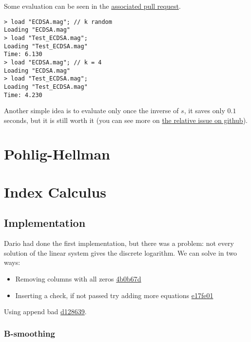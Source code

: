 \documentclass{article}
\theoremstyle{plain}
\theoremstyle{remark}
\theoremstyle{definition}
\begin{document}
Some evaluation can be seen in the \href{https://github.com/giacomoborin/project2_MAGMA/pull/36}{associated pull request}.

\begin{lstlisting}[language = magma]
> load "ECDSA.mag"; // k random
Loading "ECDSA.mag"
> load "Test_ECDSA.mag";
Loading "Test_ECDSA.mag"
Time: 6.130
> load "ECDSA.mag"; // k = 4    
Loading "ECDSA.mag"
> load "Test_ECDSA.mag";
Loading "Test_ECDSA.mag"
Time: 4.230
\end{lstlisting}


Another simple idea is to evaluate only once the inverse of $s$, it saves only $0.1$ seconds, but it is still worth it (you can see more on \href{https://github.com/giacomoborin/project2_MAGMA/issues/13}{the relative issue on github}).

\section{Pohlig-Hellman}

\section{Index Calculus}

\subsection{Implementation}

Dario had done the first implementation, but there was a problem: not every solution of the linear system gives the discrete logarithm. We can solve in two ways:
\begin{itemize}
	\item Removing columns with all zeros \href{https://github.com/giacomoborin/project2_MAGMA/pull/30/commits/4b0b67d0dcbe51f01058c64a06a1c39fdb5cf56e}{4b0b67d}
	\item Inserting a check, if not passed try adding more equations \href{https://github.com/giacomoborin/project2_MAGMA/pull/30/commits/e17fe016088c6746c46d52d7154922060f8e5366}{e17fe01}
\end{itemize}



Using append bad \href{https://github.com/giacomoborin/project2_MAGMA/commit/d12863968fe66504486fa7fea78929ab2aa98f43}{d128639}. 

\subsubsection{B-smoothing}
\end{document}

